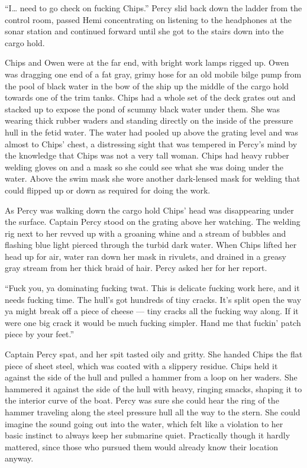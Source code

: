 \documentclass[]{article}
\begin{document}
\begin{multicols}{2}
``I\ldots{} need to go check on fucking Chips.'' Percy slid back down
the ladder from the control room, passed Hemi concentrating on listening
to the headphones at the sonar station and continued forward until she
got to the stairs down into the cargo hold.

Chips and Owen were at the far end, with bright work lamps rigged up.
Owen was dragging one end of a fat gray, grimy hose for an old mobile
bilge pump from the pool of black water in the bow of the ship up the
middle of the cargo hold towards one of the trim tanks. Chips had a
whole set of the deck grates out and stacked up to expose the pond of
scummy black water under them. She was wearing thick rubber waders and
standing directly on the inside of the pressure hull in the fetid water.
The water had pooled up above the grating level and was almost to Chips'
chest, a distressing sight that was tempered in Percy's mind by the
knowledge that Chips was not a very tall woman. Chips had heavy rubber
welding gloves on and a mask so she could see what she was doing under
the water. Above the swim mask she wore another dark-lensed mask for
welding that could flipped up or down as required for doing the work.

As Percy was walking down the cargo hold Chips' head was disappearing
under the surface. Captain Percy stood on the grating above her
watching. The welding rig next to her revved up with a groaning whine
and a stream of bubbles and flashing blue light pierced through the
turbid dark water. When Chips lifted her head up for air, water ran down
her mask in rivulets, and drained in a greasy gray stream from her thick
braid of hair. Percy asked her for her report.

``Fuck you, ya dominating fucking twat. This is delicate fucking work
here, and it needs fucking time. The hull's got hundreds of tiny cracks.
It's split open the way ya might break off a piece of cheese --- tiny
cracks all the fucking way along. If it were one big crack it would be
much fucking simpler. Hand me that fuckin' patch piece by your feet.''

Captain Percy spat, and her spit tasted oily and gritty. She handed
Chips the flat piece of sheet steel, which was coated with a slippery
residue. Chips held it against the side of the hull and pulled a hammer
from a loop on her waders. She hammered it against the side of the hull
with heavy, ringing smacks, shaping it to the interior curve of the
boat. Percy was sure she could hear the ring of the hammer traveling
along the steel pressure hull all the way to the stern. She could
imagine the sound going out into the water, which felt like a violation
to her basic instinct to always keep her submarine quiet. Practically
though it hardly mattered, since those who pursued them would already
know their location anyway.


\end{multicols}
\end{document}
